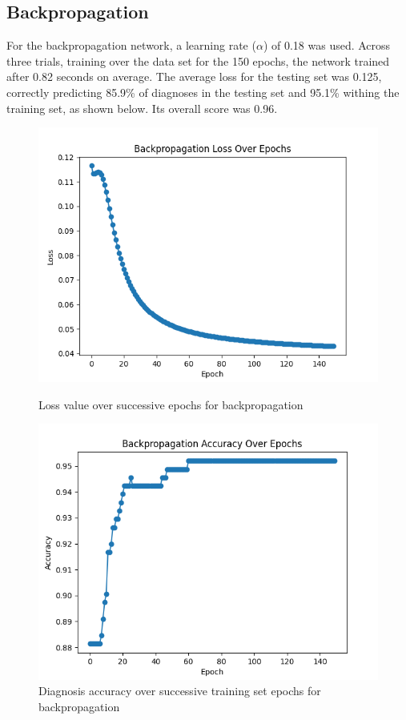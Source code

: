\documentclass[12pt]{article}
\begin{document}
    \subsection{Backpropagation}
        For the backpropagation network, a learning rate (\(\alpha\)) of 0.18 was used.  Across three trials, training over the data set for
        the 150 epochs, the network trained after 0.82 seconds on average.  The average loss for the testing set was 0.125, 
        correctly predicting 85.9\% of diagnoses in the testing set and 95.1\% withing the training set, as shown below.
        Its overall score was 0.96.
        \begin{figure}[h]
            \begin{minipage}{0.48\textwidth}
                \centering
                \includegraphics[width=.9\linewidth]{backproplosses.png}
                \caption{Loss value over successive epochs for backpropagation}
            \end{minipage}\hfill
            \begin{minipage}{0.48\textwidth}
                \centering
                \includegraphics[width=.9\linewidth]{backpropaccuracy.png}
                \caption{Diagnosis accuracy over successive training set epochs for backpropagation}
            \end{minipage}
        \end{figure}
\end{document}
